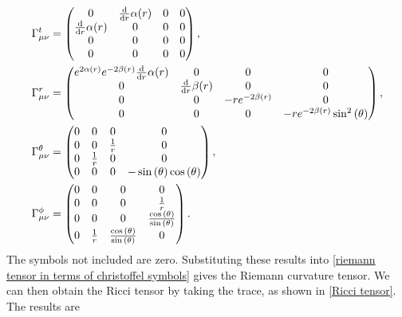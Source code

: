 \begin{align}
    \Gamma^t_{\mu \nu}
    & =
    \left(
        \begin{matrix}
            0 & \odv{}{r} \alpha{\left(r \right)} & 0 & 0\\\odv{}{r} \alpha{\left(r \right)} & 0 & 0 & 0\\0 & 0 & 0 & 0\\0 & 0 & 0 & 0
        \end{matrix}
    \right), \\
    \Gamma^r_{\mu \nu}
    &=
    \left(
        \begin{matrix}
            e^{2 \alpha{\left(r \right)}} e^{- 2 \beta{\left(r \right)}} \odv{}{r} \alpha{\left(r \right)} & 0 & 0 & 0\\0 & \odv{}{r} \beta{\left(r \right)} & 0 & 0\\0 & 0 & - r e^{- 2 \beta{\left(r \right)}} & 0\\0 & 0 & 0 & - r e^{- 2 \beta{\left(r \right)}} \sin^{2}{\left(\theta \right)}
        \end{matrix}
     \right), \\
     \Gamma^\theta_{\mu \nu} 
     & =
     \left(
         \begin{matrix}
            0 & 0 & 0 & 0\\0 & 0 & \frac{1}{r} & 0\\0 & \frac{1}{r} & 0 & 0\\0 & 0 & 0 & - \sin{\left(\theta \right)} \cos{\left(\theta \right)}
        \end{matrix}
    \right), \\
    \Gamma^\phi_{\mu \nu} 
    &=
    \left(
        \begin{matrix}
            0 & 0 & 0 & 0\\0 & 0 & 0 & \frac{1}{r}\\0 & 0 & 0 & \frac{\cos{\left(\theta \right)}}{\sin{\left(\theta \right)}}\\0 & \frac{1}{r} & \frac{\cos{\left(\theta \right)}}{\sin{\left(\theta \right)}} & 0
        \end{matrix}
    \right).
\end{align}
%
The symbols not included are zero.
Substituting these results into \autoref{riemann tensor in terms of christoffel symbols} gives the Riemann curvature tensor.
We can then obtain the Ricci tensor by taking the trace, as shown in \autoref{Ricci tensor}.
The results are
%
